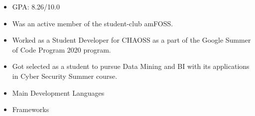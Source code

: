 


\begin{itemize}
    \item GPA: 8.26/10.0
    \item Was an active member of the student-club amFOSS.
    \item Worked as a Student Developer for CHAOSS as a part of the Google Summer of Code Program 2020 program.
\end{itemize}

\divider


\begin{itemize}
    \item Got selected as a student to pursue Data Mining and BI with its applications in Cyber Security Summer course.
\end{itemize}










\begin{itemize}
    \item \textcolor{emphasis}{Main Development Languages} 
\end{itemize}

\smallskip\smallskip

\begin{itemize}
    \item \textcolor{emphasis}{Frameworks} 
\end{itemize}

